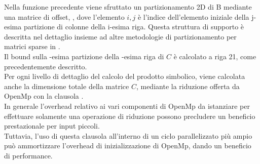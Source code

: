 Nella funzione precedente viene sfruttato un partizionamento 2D di B mediante una matrice di offset, ,
dove l'elemento $i,j$ è l'indice dell'elemento \nnz iniziale della 
j-esima partizione di colonne della i-esima riga.
Questa struttura di supporto è descritta nel dettaglio insieme ad altre metodologie di partizionamento 
per matrici sparse in .\\
Il bound sulla -esima partizione della -esima riga di $C$ 
è calcolato a riga 21, come precedentemente descritto.\\ 
\label{chSpMMSymb:OMPSetupCosts}
Per ogni livello di dettaglio del calcolo del prodotto simbolico, viene calcolata anche la dimensione
totale della matrice $C$, mediante la riduzione offerta da OpenMp con la clausola .\\
In generale l'overhead relativo ai vari componenti di OpenMp da istanziare per effettuare solamente
una operazione di riduzione possono precludere un beneficio prestazionale per input piccoli.
\\Tuttavia, l'uso di questa clausola all'interno di un ciclo parallelizzato più ampio può ammortizzare
l'overhead di inizializzazione di OpenMp, dando un beneficio di performance.\\


